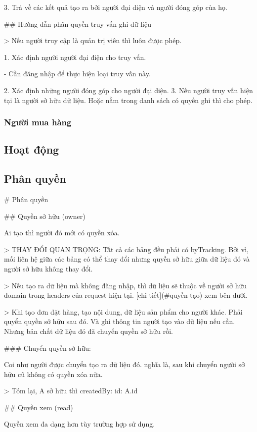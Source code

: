 3. Trả về các kết quả tạo ra bởi người đại diện và người đóng góp của họ.

\#\# Hướng dẫn phân quyền truy vấn ghi dữ liệu

> Nếu người truy cập là quản trị viên thì luôn được phép.

1. Xác định người người đại điện cho truy vấn.

-   Cần đăng nhập để thực hiện loại truy vấn này.

2. Xác định những người đóng góp cho người đại diện.
3. Nếu người truy vấn hiện tại là người sở hữu dữ liệu. Hoặc nằm trong danh sách có quyền ghi thì cho phép.

\subsubsection{Người mua hàng}
\subsection{Hoạt động}
\subsection{Phân quyền}

\# Phân quyền

\#\# Quyền sở hữu (owner)

Ai tạo thì người đó mới có quyền xóa.

> THAY ĐỔI QUAN TRỌNG: Tất cả các bảng đều phải có byTracking. Bởi vì, mối liên hệ giữa các bảng có thể thay đổi nhưng quyền sở hữu giữa dữ liệu đó và người sở hữu không thay đổi.

> Nếu tạo ra dữ liệu mà không đăng nhập, thì dữ liệu sẽ thuộc về người sở hữu domain trong headers của request hiện tại. [chi tiết](\#quyền-tạo) xem bên dưới.

> Khi tạo đơn đặt hàng, tạo nội dung, dữ liệu sản phẩm cho người khác. Phải quyển quyền sở hữu sau đó. Và ghi thông tin người tạo vào dữ liệu nếu cần. Nhưng bản chất dữ liệu đó đã chuyển quyền sở hữu rồi.

\#\#\# Chuyển quyền sở hữu:

Coi như người được chuyển tạo ra dữ liệu đó.
nghĩa là, sau khi chuyển người sở hữu cũ không có quyền xóa nữa.

> Tóm lại, A sở hữu thì createdBy: { id: A.id }

\#\# Quyền xem (read)

Quyền xem đa dạng hơn tùy trường hợp sử dụng.

